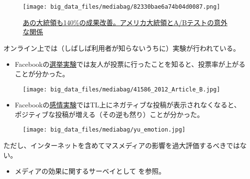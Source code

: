 \documentclass[
  xelatex,
  ja=standard]{bxjsarticle}
\providecommand{\tightlist}{%
  \setlength{\itemsep}{0pt}\setlength{\parskip}{0pt}}\usepackage{longtable,booktabs,array}
\begin{document}
\begin{figure}[htpb]

{\centering \texttt{[image: big\_data\_files/mediabag/82330bae6a74b04d0087.png]}

}

\caption{\href{https://juicer.cc/articles/archives/1273/}{あの大統領も140\%の成果改善。アメリカ大統領とA/Bテストの意外な関係}}

\end{figure}

オンライン上では（しばしば利用者が知らないうちに）実験が行われている。

\begin{itemize}
\tightlist
\item
  Facebookの\href{https://www.afpbb.com/articles/-/2900894}{選挙実験}では友人が投票に行ったことを知ると、投票率が上がることが分かった。
\end{itemize}

\begin{figure}[htpb]

{\centering \texttt{[image: big\_data\_files/mediabag/41586\_2012\_Article\_B.jpg]}

}

\caption{\citet{bond2012}}

\end{figure}

\begin{itemize}
\tightlist
\item
  Facebookの\href{https://www.itmedia.co.jp/news/articles/1406/29/news007.html}{感情実験}ではTL上にネガティブな投稿が表示されなくなると、ポジティブな投稿が増える（その逆も然り）ことが分かった。
\end{itemize}

\begin{figure}[htpb]

{\centering \texttt{[image: big\_data\_files/mediabag/yu\_emotion.jpg]}

}

\caption{\citet{kramer2014}}

\end{figure}

ただし、インターネットを含めてマスメディアの影響を過大評価するべきではない。

\begin{itemize}
\tightlist
\item
  メディアの効果に関するサーベイとして \citet{inamasu2022} を参照。
\end{itemize}
\end{document}
